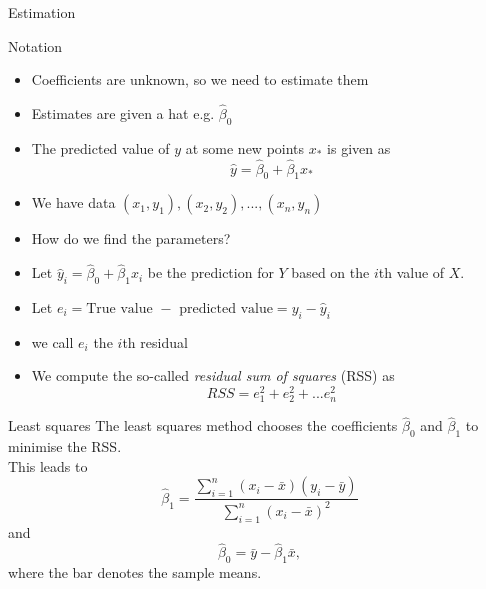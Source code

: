 \documentclass{bredelebeamer}
\begin{document}
\begin{frame}{Estimation}
\begin{block}{Notation}
\begin{itemize}
	\item Coefficients are unknown, so we need to estimate them
\item Estimates are given a hat e.g. $\hat{\beta}_0$
\item The predicted value of $y$ at some new points $x_*$ is given as
\begin{equation}
\hat{y} = \hat{\beta}_0 + \hat{\beta}_1x_*
\end{equation}
\item We have data $(x_1,y_1),(x_2, y_2),...,(x_n,y_n)$
\item How do we find the parameters?
\item Let $\hat{y}_i = \hat{\beta}_0 + \hat{\beta}_1x_i$ be the prediction for $Y$ based on the $i$th value of $X$.
\item Let $e_i = \text{True value } - \text{ predicted value} = y_i - \hat{y}_i$
\item we call $e_i$ the $i$th residual
\item We compute the so-called \textit{residual sum of squares} (RSS) as
\begin{equation}
RSS = e^2_1 + e^2_2 + ... e^2_n
\end{equation}

\end{itemize}

\end{block}

\end{frame}

\begin{frame}{Least squares}
The least squares method chooses the coefficients $\hat{\beta}_0$ and $\hat{\beta}_1$ to minimise the RSS.
\\
This leads to
\begin{equation}
\hat{\beta}_1 = \frac{\sum_{i=1}^{n}(x_i - \bar{x})(y_i - \bar{y})}{\sum_{i=1}^{n}(x_i - \bar{x})^2}
\end{equation}
and
\begin{equation}
\hat{\beta}_0 = \bar{y} - \hat{\beta}_1 \bar{x},
\end{equation}
where the bar denotes the sample means.
\end{frame}
\end{document}
